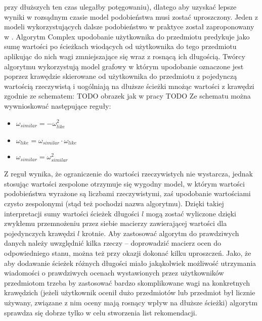 \documentclass{pracamgr}
\begin{document}
    przy dłuższych ten czas ulegałby potęgowaniu), dlatego aby uzyskać lepsze wyniki w rozsądnym czasie model podobieństwa musi zostać uproszczony.
    Jeden z modeli wykorzystujących dalsze podobieństwo w praktyce został zaproponowany w \cite{205}. Algorytm Complex upodobanie użytkownika do przedmiotu
    predykuje jako sumę wartości po ścieżkach wiodących od użytkownika do tego przedmiotu aplikując do nich wagi zmniejszające się wraz z rosnącą ich długością.
    Twórcy algorytmu wykorzystują model grafowy w którym upodobanie oznaczone jest poprzez krawędzie skierowane
    od użytkownika do przedmiotu z pojedynczą wartością rzeczywistą i uogólniają na dłuższe ścieżki mnożąc wartości z krawędzi zgodnie ze schematem:\newline
    TODO obrazek jak w pracy TODO \newline\newline
    Ze schematu można wywnioskować następujące reguły:
    \begin{itemize}\itemsep1pt \parskip0pt 
     \item $\omega_{similar}=-\omega^2_{like}$
     \item $\omega_{like}=\omega_{similar}\cdot\omega_{like}$
     \item $\omega_{similar}=\omega^2_{similar}$
    \end{itemize}
    Z reguł wynika, że ograniczenie do wartości rzeczywistych nie wystarcza, jednak stosując wartości zespolone otrzymuje się wygodny model,
    w którym wartości podobieństwa wyrażone są liczbami rzeczywistymi, zaś upodobanie wartościami czysto zespolonymi (stąd też pochodzi nazwa algorytmu).
    Dzięki takiej interpretacji sumy wartości ścieżek długości $l$ mogą zostać wyliczone dzięki zwykłemu przemnożeniu przez siebie macierzy zawierającej
    wartości dla pojedynczych krawędzi $l$ krotnie.\newline
    Aby zastosować algorytm do prawdziwych danych należy uwzględnić kilka rzeczy -- doprowadzić macierz ocen do odpowiedniego stanu,
    można też przy okazji dokonać kilku uproszczeń.
    Jako, że aby dodawanie ścieżek różnych długości miało jakąkolwiek możliwość utrzymania wiadomości
    o prawdziwych ocenach wystawionych przez użytkowników przedmiotom trzeba by zastosować bardzo skomplikowane wagi na konkretnych krawędzich
    (jeżeli użytkownik ocenił dużo przedmiotów lub przedmiot był licznie używany, związane z nim oceny mają rosnący wpływ na dłuższe ścieżki)
    algorytm sprawdza się dobrze tylko w celu stworzenia list rekomendacji.
\end{document}
